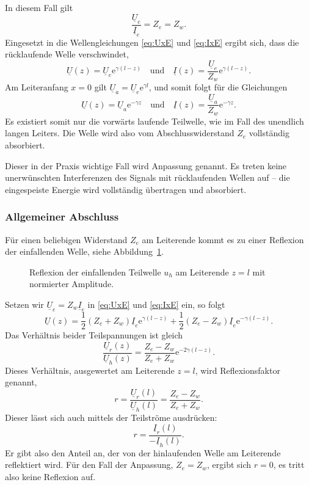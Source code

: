 \documentclass[paper=a4, parskip=half-, ngerman, fontsize=11pt]{scrreprt}
\begin{document}
In diesem Fall gilt
\[ \frac{\underline{U}_{e}}{\underline{I}_{e}} = Z_{e} = Z_{w}. \]
Eingesetzt in die Wellengleichungen \eqref{eq:UxE} und \eqref{eq:IxE} ergibt sich, dass die rücklaufende Welle
verschwindet,
\[ \underline{U}(z) = \underline{U}_{e} \mathrm{e}^{\gamma (l - z)} \quad \text{und} \quad
\underline{I}(z) = \frac{\underline{U}_{e}}{Z_{w}} \mathrm{e}^{\gamma (l - z)}. \]
Am Leiteranfang $x = 0$ gilt $\underline{U}_{a} = \underline{U}_{e} \mathrm{e}^{\gamma l}$, und somit
folgt für die Gleichungen
\[ \underline{U}(z) = \underline{U}_{a} \mathrm{e}^{- \gamma z} \quad \text{und} \quad
\underline{I}(z) = \frac{\underline{U}_{a}}{Z_{w}} \mathrm{e}^{- \gamma z}. \]
Es existiert somit nur die vorwärts laufende Teilwelle, wie im Fall des unendlich langen Leiters. Die Welle wird also
vom Abschlusswiderstand $Z_{e}$ vollständig absorbiert.

Dieser in der Praxis wichtige Fall wird Anpassung genannt. Es treten keine unerwünschten Interferenzen des Signals mit
rücklaufenden Wellen auf -- die eingespeiste Energie wird vollständig übertragen und absorbiert.

\subsubsection{Allgemeiner Abschluss}
Für einen beliebigen Widerstand $Z_{e}$ am Leiterende kommt es zu einer Reflexion der einfallenden Welle, siehe
Abbildung~\ref{ReflektierteWelle}.
\begin{figure}[!htb]
    \begin{center}
        
        \caption{Reflexion der einfallenden Teilwelle $u_{h}$ am Leiterende $z=l$ mit normierter Amplitude.}
        \label{ReflektierteWelle}
    \end{center}
\end{figure}

Setzen wir $\underline{U}_{e} = Z_{w} \underline{I}_{e}$ in \eqref{eq:UxE} und \eqref{eq:IxE} ein, so folgt
\[
\underline{U}(z) = \frac{1}{2} (Z_{e} + Z_{w}) \underline{I}_{e} \mathrm{e}^{\gamma (l - z)}
+
\frac{1}{2} (Z_{e} - Z_{w}) \underline{I}_{e} \mathrm{e}^{- \gamma (l - z)} .
\]
Das Verhältnis beider Teilspannungen ist gleich
\[
\frac{\underline{U}_{r}(z)}{\underline{U}_{h}(z)} = \frac{Z_{e}-Z_{w}}{Z_{e}+Z_{w}} \mathrm{e}^{-2 \gamma (l-z)}.
\]
Dieses Verhältnis, ausgewertet am Leiterende $z = l$, wird Reflexionsfaktor genannt,
\begin{equation}
r = \frac{\underline{U}_{r}(l)}{\underline{U}_{h}(l)} = \frac{Z_{e}-Z_{w}}{Z_{e}+Z_{w}} \label{eq:RFactor}.
\end{equation}
Dieser lässt sich auch mittels der Teilströme ausdrücken:
\begin{equation}
    r = \frac{\underline{I}_{r}(l)}{- \underline{I}_{h}(l)}.
\end{equation}
Er gibt also den Anteil an, der von der hinlaufenden Welle am Leiterende reflektiert wird. Für den Fall der Anpassung,
$Z_{e} = Z_{w}$, ergibt sich $r = 0$, es tritt also keine Reflexion auf.
\end{document}
